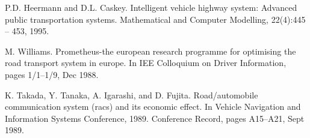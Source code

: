 \documentclass[conference]{IEEEtran}
\begin{document}
\begin{thebibliography}{00}
     P.D. Heermann and D.L. Caskey. Intelligent vehicle highway system: Advanced public transportation
    systems. Mathematical and Computer Modelling, 22(4):445 – 453, 1995.
    
     M. Williams. Prometheus-the european research programme for optimising the road transport
    system in europe. In IEE Colloquium on Driver Information, pages 1/1–1/9, Dec 1988.
    
     K. Takada, Y. Tanaka, A. Igarashi, and D. Fujita. Road/automobile communication system
    (racs) and its economic effect. In Vehicle Navigation and Information Systems Conference,
    1989. Conference Record, pages A15–A21, Sept 1989.
\end{thebibliography}
\end{document}
